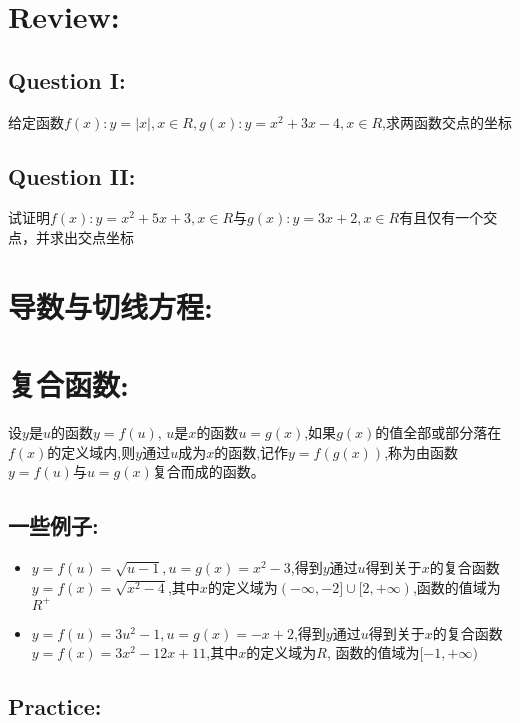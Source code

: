 \documentclass[UTF8]{article}
\begin{document}
\section{Review:}

\subsection{Question I:}

给定函数$f(x) : y = |x|, x \in R, g(x) : y = x^2 + 3x - 4, x \in R$,求两函数交点的坐标

\subsection{Question II:}

试证明$f(x) : y = x^2 + 5x + 3, x \in R$与$g(x) : y = 3x + 2, x \in R$有且仅有一个交点，并求出交点坐标\\

\section{导数与切线方程:}


\section{复合函数:}

设$y$是$u$的函数$y = f(u)$, $u$是$x$的函数$u = g(x)$,如果$g(x)$的值全部或部分落在$f(x)$的定义域内,则$y$通过$u$成为$x$的函数,记作$y = f(g(x))$,称为由函数$y = f(u)$与$u = g(x)$复合而成的函数。

\subsection{一些例子:}

\begin{itemize}
	\item $y = f(u) = \sqrt{u - 1}, u = g(x) = x^2 - 3$,得到$y$通过$u$得到关于$x$的复合函数$y = f(x) = \sqrt{x^2 - 4}$,其中$x$的定义域为$(-\infty, -2] \cup [2, +\infty)$,函数的值域为$R^{+}$

	\item $y = f(u) = 3u^2 - 1, u = g(x) = -x + 2$,得到$y$通过$u$得到关于$x$的复合函数$y = f(x) = 3x^2 - 12x + 11$,其中$x$的定义域为$R$, 函数的值域为$[-1, +\infty)$
\end{itemize}


\subsection{Practice:}
\end{document}
